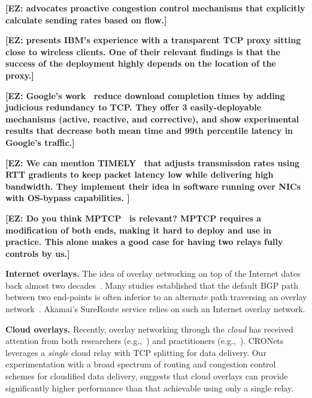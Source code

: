 \documentclass[sigconf,usenames,dvipsnames,geometry]{acmart}
\newcommand{\mycomm}[3]{{\color{#2} \textbf{[#1: #3]}}}
\newcommand{\mycomm}[3]{}
\newcommand{\IK}[1]{\mycomm{IK}{blue}{#1}}
\newcommand{\EZ}[1]{\mycomm{EZ}{BlueGreen}{#1}}
\newcommand{\T}[1]{\smallskip\noindent\textbf{#1}} %
\begin{document}
\EZ{\cite{jose2015proactive} advocates proactive congestion control mechanisms that explicitly calculate sending rates based on flow.}

\EZ{\cite{le2015experiences} presents IBM's experience with a transparent TCP proxy sitting close to wireless clients. One of their relevant findings is that the success of the deployment highly depends on the location of the proxy.}

\EZ{Google's work~\cite{flach2013reducing} reduce download completion times by adding judicious redundancy to TCP. They offer 3 easily-deployable mechanisms (active, reactive, and corrective), and show experimental results that decrease both mean time and 99th percentile latency in Google's traffic.}

\EZ{We can mention TIMELY~\cite{mittal2015timely} that adjusts transmission rates using RTT gradients to keep packet latency low while delivering high bandwidth. They implement their idea in software running over NICs with OS-bypass capabilities.
}

\EZ{Do you think MPTCP~\cite{barre2010mptcp} is relevant? MPTCP requires a modification of both ends, making it hard to deploy and use in practice. This alone makes a good case for having two relays fully controls by us.}

\T{Internet overlays.} The idea of overlay networking on top of the Internet dates back almost two decades~\cite{old-overlay-1, old-overlay-2, RON}. Many studies established that the default BGP path between two end-points is often inferior to an alternate path traversing an overlay network~\cite{old-overlay-1, old-overlay-2, RON, akamai-2, akamai-3, akamai-4}. Akamai's SureRoute service relies on such an Internet overlay network.

\T{Cloud overlays.} Recently, overlay networking through the \emph{cloud} has received attention from both researchers (e.g.,~\cite{CRONets}) and practitioners (e.g.,~\cite{teridion}). CRONets~\cite{CRONets} leverages a \emph{single} cloud relay with TCP splitting for data delivery. Our experimentation with a broad spectrum of routing and congestion control schemes for cloudified data delivery, suggests that cloud overlays can provide significantly higher performance than that achievable using only a single relay.
\end{document}
